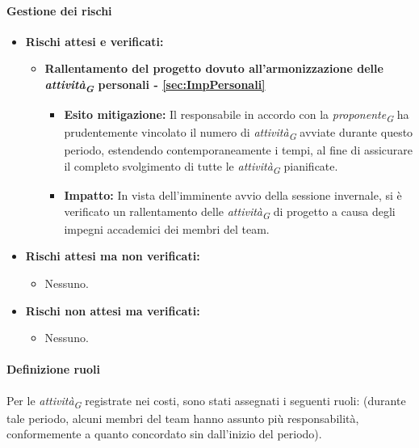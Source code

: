 \paragraph{Gestione dei rischi} 
\begin{itemize}
    \item \textbf{Rischi attesi e verificati:}
\begin{itemize}
        \item \textbf{Rallentamento del progetto dovuto all’armonizzazione delle \textit{attività}\textsubscript{\textit{G}} personali - \ref{sec:ImpPersonali}}
        \begin{itemize}
            \item \textbf{Esito mitigazione:} 
            Il responsabile in accordo con la \textit{proponente}\textsubscript{\textit{G}} ha prudentemente vincolato il numero di \textit{attività}\textsubscript{\textit{G}} avviate durante questo periodo, estendendo contemporaneamente i tempi, al fine di assicurare il completo svolgimento di tutte le \textit{attività}\textsubscript{\textit{G}} pianificate.
            \item \textbf{Impatto:}
            In vista dell'imminente avvio della sessione invernale, si è verificato un rallentamento delle \textit{attività}\textsubscript{\textit{G}} di progetto a causa degli impegni accademici dei membri del team.
        \end{itemize}
\end{itemize}
\item \textbf{Rischi attesi ma non verificati:}
 \begin{itemize}
    \item Nessuno.
\end{itemize}
\item \textbf{Rischi non attesi ma verificati:}
\begin{itemize}
    \item Nessuno.
\end{itemize}
\end{itemize}

\paragraph{Definizione ruoli} \hspace{1pt}
Per le \textit{attività}\textsubscript{\textit{G}} registrate nei costi, sono stati assegnati i seguenti ruoli: (durante tale periodo, alcuni membri del team hanno assunto più responsabilità, conformemente a quanto concordato sin dall'inizio del periodo).

